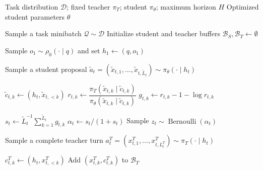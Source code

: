 \begin{algorithm}[ht]
    \caption{\name: Stochastic Teacher Intervention for Agentic On-Policy Distillation}
    \label{alg:method}
    \small
    \begin{algorithmic}[1]
        \Require Task distribution $\mathcal{D}$; fixed teacher $\pi_T$;
        student $\pi_\theta$; maximum horizon $H$
        \Ensure Optimized student parameters $\theta$

            \State Sample a task minibatch $\mathcal{Q}\sim\mathcal{D}$
            \State Initialize student and teacher buffers
            $\mathcal{B}_S,\mathcal{B}_T\gets\emptyset$

                \State Sample $o_1\sim\rho_0(\cdot\mid q)$ and set
                $h_1\gets(q,o_1)$

                    \State Sample a student proposal
                    $\widetilde a_t=(\widetilde x_{t,1},\ldots,
                    \widetilde x_{t,\widetilde L_t})
                    \sim\pi_\theta(\cdot\mid h_t)$

                        \State $\widetilde c_{t,k}\gets
                        (h_t,\widetilde x_{t,<k})$
                        \State $r_{t,k}\gets
                        \dfrac{
                        \pi_T(\widetilde x_{t,k}\mid\widetilde c_{t,k})
                        }{
                        \pi_\theta(\widetilde x_{t,k}\mid\widetilde c_{t,k})
                        }$
                        \State $g_{t,k}\gets
                        r_{t,k}-1-\log r_{t,k}$
                    \EndFor

                    \State $s_t\gets
                    \widetilde L_t^{-1}
                    \sum_{k=1}^{\widetilde L_t}g_{t,k}$
                    \State $\alpha_t\gets s_t/(1+s_t)$
                    \State Sample
                    $z_t\sim\operatorname{Bernoulli}(\alpha_t)$

                        \State Sample a complete teacher turn
                        $a_t^T=(x^T_{t,1},\ldots,x^T_{t,L_t^T})
                        \sim\pi_T(\cdot\mid h_t)$

                            \State $c^T_{t,k}\gets(h_t,x^T_{t,<k})$
                            \State Add $(x^T_{t,k},c^T_{t,k})$
                            to $\mathcal{B}_T$
                        \EndFor


\end{algorithmic}
\end{algorithm}

